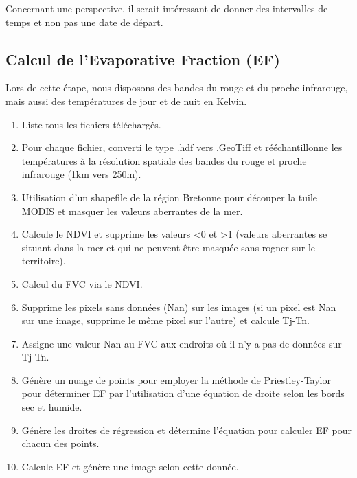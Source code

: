 \documentclass[10pt,a4paper]{article}
\begin{document}
Concernant une perspective, il serait intéressant de donner des intervalles de temps et non pas une date de départ.

\subsection{Calcul de l'Evaporative Fraction (EF)}

Lors de cette étape, nous disposons des bandes du rouge et du proche infrarouge, mais aussi des températures de jour et de nuit en Kelvin.

\begin{enumerate}
\item Liste tous les fichiers téléchargés.
\item  Pour chaque fichier, converti le type .hdf vers .GeoTiff et rééchantillonne les températures à la résolution spatiale des bandes du rouge et proche infrarouge (1km vers 250m).
\item Utilisation d'un shapefile de la région Bretonne pour découper la tuile MODIS et masquer les valeurs aberrantes de la mer.
\item Calcule le NDVI et supprime les valeurs <0 et >1 (valeurs aberrantes se situant dans la mer et qui ne peuvent être masquée sans rogner sur le territoire).
\item Calcul du FVC via le NDVI.
\item Supprime les pixels sans données (Nan) sur les images (si un pixel est Nan sur une image, supprime le même pixel sur l'autre) et calcule Tj-Tn.
\item Assigne une valeur Nan au FVC aux endroits où il n'y a pas de données sur Tj-Tn.
\item Génère un nuage de points pour employer la méthode de Priestley-Taylor pour déterminer EF par l'utilisation d'une équation de droite selon les bords sec et humide.
\item Génère les droites de régression et détermine l'équation pour calculer EF pour chacun des points.
\item Calcule EF et génère une image selon cette donnée.
\end{enumerate}
\end{document}
